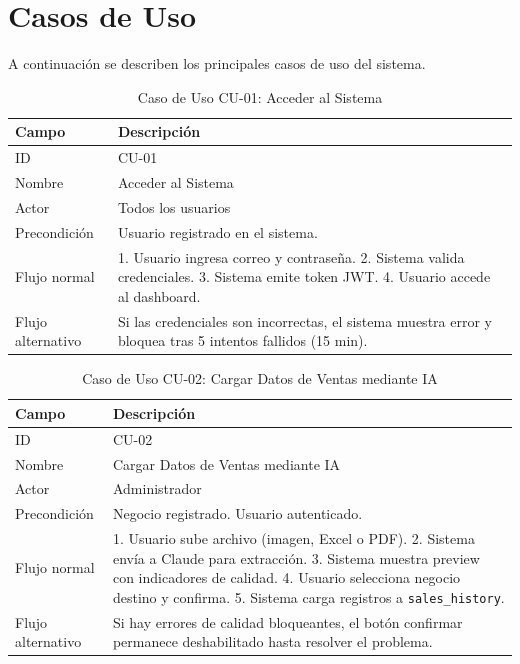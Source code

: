 \documentclass[12pt, a4paper]{report}
\begin{document}
\section{Casos de Uso}

A continuación se describen los principales casos de uso del sistema.

\begin{table}[H]
  \centering
  \caption{Caso de Uso CU-01: Acceder al Sistema}
  \label{tab:cu01}
  \begin{tabular}{|l|p{9cm}|}
    \hline
    \textbf{Campo} & \textbf{Descripción} \\
    \hline
    ID            & CU-01 \\
    Nombre        & Acceder al Sistema \\
    Actor         & Todos los usuarios \\
    Precondición  & Usuario registrado en el sistema. \\
    Flujo normal  & 1. Usuario ingresa correo y contraseña. 2. Sistema valida credenciales.
                    3. Sistema emite token JWT. 4. Usuario accede al dashboard. \\
    Flujo alternativo & Si las credenciales son incorrectas, el sistema muestra error y
                        bloquea tras 5 intentos fallidos (15 min). \\
    \hline
  \end{tabular}
\end{table}

\begin{table}[H]
  \centering
  \caption{Caso de Uso CU-02: Cargar Datos de Ventas mediante IA}
  \label{tab:cu02}
  \begin{tabular}{|l|p{9cm}|}
    \hline
    \textbf{Campo} & \textbf{Descripción} \\
    \hline
    ID            & CU-02 \\
    Nombre        & Cargar Datos de Ventas mediante IA \\
    Actor         & Administrador \\
    Precondición  & Negocio registrado. Usuario autenticado. \\
    Flujo normal  & 1. Usuario sube archivo (imagen, Excel o PDF). 2. Sistema envía a
                    Claude para extracción. 3. Sistema muestra preview con indicadores
                    de calidad. 4. Usuario selecciona negocio destino y confirma.
                    5. Sistema carga registros a \texttt{sales\_history}. \\
    Flujo alternativo & Si hay errores de calidad bloqueantes, el botón confirmar
                        permanece deshabilitado hasta resolver el problema. \\
    \hline
  \end{tabular}
\end{table}
\end{document}
